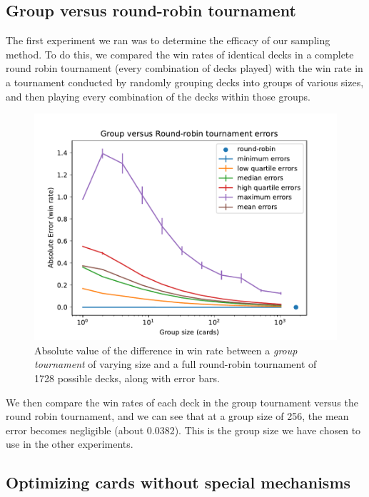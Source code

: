 \subsection{Group versus round-robin tournament}

The first experiment we ran was to determine the efficacy of our sampling method. To do this, we compared the win rates of identical decks in a complete round robin tournament (every combination of decks played) with the win rate in a tournament conducted by randomly grouping decks into groups of various sizes, and then playing every combination of the decks within those groups.

\begin{figure}[t]
	\centering
	\includegraphics[width=0.9\columnwidth]{group_vs_rr_fig}
	\caption{Absolute value of the difference in win rate between a \textit{group tournament} of varying size and a full round-robin tournament of 1728 possible decks, along with error bars.}
	\label{fig:group_vs_rr}
\end{figure}


We then compare the win rates of each deck in the group tournament versus the round robin tournament, and we can see that at a group size of 256, the mean error becomes negligible (about 0.0382). This is the group size we have chosen to use in the other experiments.


 \subsection{Optimizing cards without special mechanisms}

